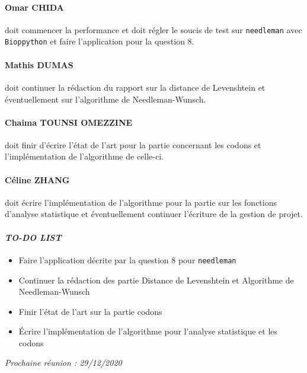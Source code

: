 \paragraph*{Omar CHIDA} doit commencer la performance et doit régler le soucis de test sur \texttt{needleman} avec \texttt{Bioppython} et faire l'application pour la question 8.

\paragraph*{Mathis DUMAS} doit continuer la rédaction du rapport sur la distance de Levenshtein et éventuellement sur l'algorithme de Needleman-Wunsch.

\paragraph*{Chaima TOUNSI OMEZZINE} doit finir d'écrire l'état de l'art pour la partie concernant les codons et l'implémentation de l'algorithme de celle-ci.

\paragraph*{Céline ZHANG} doit écrire l'implémentation de l'algorithme pour la partie sur les fonctions d'analyse statistique et éventuellement continuer l'écriture de la gestion de projet.

\paragraph{\emph{TO-DO LIST}}
\begin{itemize}
    \item Faire l'application décrite par la question 8 pour \texttt{needleman}
    \item Continuer la rédaction des partie Distance de Levenshtein et Algorithme de Needleman-Wunsch
    \item Finir l'état de l'art sur la partie codons
    \item Écrire l'implémentation de l'algorithme pour l'analyse statistique et les codons
\end{itemize}

\emph{Prochaine réunion : 29/12/2020}\\

% 